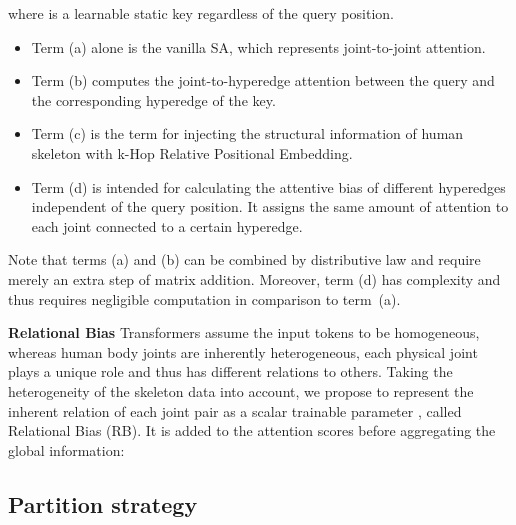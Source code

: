 \documentclass[10pt,twocolumn,letterpaper]{article}
\begin{document}
where  is a learnable static key regardless of the query position. 
\begin{itemize}
    \item Term (a) alone is the vanilla SA, which represents joint-to-joint attention.
    \item Term (b) computes the joint-to-hyperedge attention between the  query and the corresponding hyperedge of the  key.
    \item Term (c) is the term for injecting the structural information of human skeleton with k-Hop Relative Positional Embedding. 
    \item Term (d) is intended for calculating the attentive bias of different hyperedges independent of the query position. It assigns the same amount of attention to each joint connected to a certain hyperedge.
\end{itemize}

Note that terms (a) and (b) can be combined by distributive law and require merely an extra step of matrix addition. Moreover, term (d) has  complexity and thus requires negligible computation in comparison to term~(a).

\noindent \textbf{Relational Bias}
Transformers assume the input tokens to be homogeneous, whereas human body joints are inherently heterogeneous, \eg each physical joint plays a unique role and thus has different relations to others.
Taking the heterogeneity of the skeleton data into account, we propose to represent the inherent relation of each joint pair as a scalar trainable parameter , called Relational Bias (RB).  It is added to the attention scores before aggregating the global information:


\subsection{Partition strategy}
\label{sec:learn}
\end{document}
